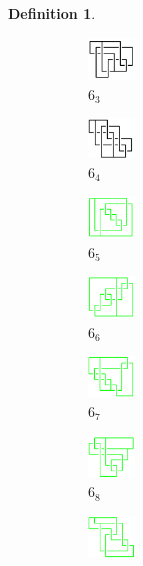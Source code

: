 \documentclass{article}
\theoremstyle{definition}
\newtheorem{defn}[thm]{Definition}
\theoremstyle{theorem}
\theoremstyle{proposition}
\theoremstyle{corollary}
\begin{document}
\begin{defn}
\begin{figure}[H]
\begin{subfigure}{0.075\textwidth}
    \includegraphics[width=1.25cm]{../Midterm_Poster/grid_diagram/theta_6_3.png}
    \caption{$6_3$} 
    \end{subfigure}
    \begin{subfigure}{0.075\textwidth}
    \includegraphics[width=1.25cm]{../Midterm_Poster/grid_diagram/theta_6_4.png}
    \caption{$6_4$} 
    \end{subfigure}
    \begin{subfigure}{0.075\textwidth}
    \includegraphics[width=1.25cm]{../Midterm_Poster/grid_diagram/theta_6_5.png}
    \caption{$6_5$} 
    \end{subfigure}
    \begin{subfigure}{0.075\textwidth}
    \includegraphics[width=1.25cm]{../Midterm_Poster/grid_diagram/theta_6_6.png}
    \caption{$6_6$} 
    \end{subfigure}
    \begin{subfigure}{0.075\textwidth}
    \includegraphics[width=1.25cm]{../Midterm_Poster/grid_diagram/theta_6_7.png}
    \caption{$6_7$} 
    \end{subfigure}
      \begin{subfigure}{0.075\textwidth}
    \includegraphics[width=1.25cm]{../Midterm_Poster/grid_diagram/theta_6_8.png}
    \caption{$6_8$} 
    \end{subfigure}
    \begin{subfigure}{0.075\textwidth}
    \includegraphics[width=1.25cm]{../Midterm_Poster/grid_diagram/theta_6_9.png}

\end{subfigure}
\end{figure}
\end{defn}
\end{document}
